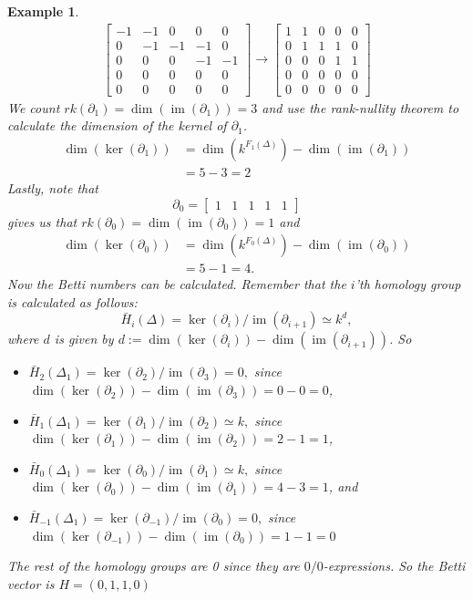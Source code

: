\documentclass[11pt,a4paper,twoside]{report}
\newtheorem{myex}[mythm]{Example}
\DeclareMathOperator{\im}{im}
\begin{document}
\begin{myex}
\begin{align*}
\begin{bmatrix}
-1 & -1 & 0 & 0 & 0\\
0 & -1 & -1 & -1 & 0\\
0 & 0 & 0 & -1 & -1\\
0 & 0 & 0 & 0 & 0\\
0 & 0 & 0 & 0 & 0
\end{bmatrix}
\to
\begin{bmatrix}
1 & 1 & 0 & 0 & 0\\
0 & 1 & 1 & 1 & 0\\
0 & 0 & 0 & 1 & 1\\
0 & 0 & 0 & 0 & 0\\
0 & 0 & 0 & 0 & 0
\end{bmatrix}
\end{align*}
We count $rk(\partial_1)=\dim(\im(\partial_1))=3$ and use the rank-nullity theorem to calculate the dimension of the kernel of $\partial_1$.
\begin{align*}
\dim(\ker(\partial_1))&=\dim(k^{F_1(\Delta)})-\dim(\im(\partial_1))\\
&=5-3= 2
\end{align*}
Lastly, note that 
\begin{equation*}
\partial_0=
\begin{bmatrix}
1 & 1 & 1 & 1 & 1 
\end{bmatrix}
\end{equation*}
gives us that $rk(\partial_0)=\dim(\im(\partial_0))=1$ and 
\begin{align*}
\dim(\ker(\partial_0))&=\dim(k^{F_0(\Delta)})-\dim(\im(\partial_0))\\
&=5-1= 4.
\end{align*}
Now the Betti numbers can be calculated. Remember that the $i$'th homology group is calculated as follows:
\begin{equation*}
\bar{H}_i(\Delta)=\ker(\partial_i)/\im (\partial_{i+1})\simeq k^d,
\end{equation*}
where $d$ is given by $d:=\dim(\ker(\partial_i))-\dim(\im(\partial_{i+1}))$. So 
\begin{itemize}
\item$\bar{H}_2(\Delta_1)=\ker(\partial_2)/\im(\partial_{3})=0,$
since $\dim(\ker(\partial_2))-\dim(\im(\partial_{3}))=0-0=0$,
\item$\bar{H}_1(\Delta_1)=\ker(\partial_1)/\im(\partial_{2})\simeq k,$ since $\dim(\ker(\partial_1))-\dim(\im(\partial_{2}))=2-1=1$,
\item$\bar{H}_0(\Delta_1)=\ker(\partial_0)/\im(\partial_{1})\simeq k,$
since $\dim(\ker(\partial_0))-\dim(\im(\partial_{1}))=4-3=1$, and 
\item$\bar{H}_{-1}(\Delta_1)=\ker(\partial_{-1})/\im(\partial_{0})=0,$
since $\dim(\ker(\partial_{-1}))-\dim(\im(\partial_{0}))=1-1=0$
\end{itemize}
The rest of the homology groups are 0 since they are $0/0$-expressions.
So the Betti vector is $H=(0,1,1,0)$
\end{myex}
\end{document}
